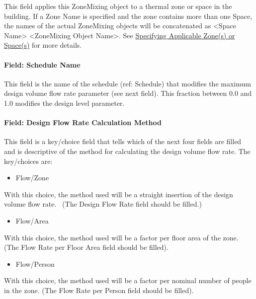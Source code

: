 This field applies this ZoneMixing object to a thermal zone or space in the building. If a Zone Name is specified and the zone contains more than one Space, the names of the actual ZoneMixing objects will be concatenated as \textless{}Space Name\textgreater{} \textless{}ZoneMixing Object Name\textgreater{}. See \hyperref[specifying-applicable-zones-or-spaces]{Specifying Applicable Zone(s) or Space(s)} for more details.

\paragraph{Field: Schedule Name}\label{field-schedule-name-3}

This field is the name of the schedule (ref: Schedule) that modifies the maximum design volume flow rate parameter (see next field). This fraction between 0.0 and 1.0 modifies the design level parameter.

\paragraph{Field: Design Flow Rate Calculation Method}\label{field-design-flow-rate-calculation-method-2}

This field is a key/choice field that tells which of the next four fields are filled and is descriptive of the method for calculating the design volume flow rate. The key/choices are:

\begin{itemize}
\tightlist
\item
  Flow/Zone
\end{itemize}

With this choice, the method used will be a straight insertion of the design volume flow rate.~ (The Design Flow Rate field should be filled.)

\begin{itemize}
\tightlist
\item
  Flow/Area
\end{itemize}

With this choice, the method used will be a factor per floor area of the zone. (The Flow Rate per Floor Area field should be filled).

\begin{itemize}
\tightlist
\item
  Flow/Person
\end{itemize}

With this choice, the method used will be a factor per nominal number of people in the zone. (The Flow Rate per Person field should be filled).

